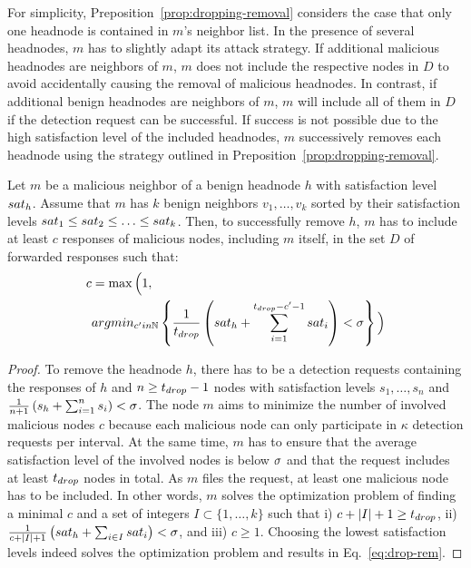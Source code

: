 For simplicity, Preposition~\ref{prop:dropping-removal} considers the case that only one headnode is contained in $m$'s neighbor list. In the presence of several headnodes, $m$ has to slightly adapt its attack strategy. 
If additional malicious headnodes are neighbors of $m$, $m$ does not include the respective nodes in $D$ to avoid accidentally causing the removal of malicious headnodes.  In contrast, if additional benign headnodes are neighbors of $m$, $m$ will include all of them in $D$ if the detection request can be successful. If success is not possible due to the high satisfaction level of the included headnodes, $m$ successively removes each headnode using the strategy outlined in Preposition~\ref{prop:dropping-removal}.   
 

\begin{proposition}
\label{prop:dropping-removal}
Let $m$ be a malicious neighbor of a benign headnode $h$ with satisfaction level $sat_h$. Assume that $m$ has $k$ benign neighbors $v_1, \ldots , v_k$ sorted by their satisfaction levels $sat_1 \leq sat_2 \leq \ldots  \leq sat_k$. 
Then, to successfully remove $h$, $m$ has to include at least $c$ responses of malicious nodes, including $m$ itself, in the set $D$ of forwarded responses such that:
\begin{align}
\label{eq:drop-rem}
\begin{split}
c &= \max \Big( 1,  \\
 & argmin_{c' in \mathbb{N}} 
\left\lbrace \frac{1}{\minP}\left(\sat_h+\sum_{i=1}^{\minP-c'-1}\sat_i \right) < \satThres \right\rbrace 
\Big)
\end{split}
\end{align}
\end{proposition}
\begin{proof}
To remove the headnode $h$, there has to be a detection requests containing the responses of $h$ and $n\geq t_{drop}-1$ nodes with satisfaction levels $s_1, \ldots , s_n$ and 
$\frac{1}{n+1}\left( s_h + \sum_{i=1}^{n}s_i \right) < \sigma$.
The node $m$ aims to minimize the number of involved malicious nodes $c$ because each malicious node can only participate in $\kappa$ detection requests per interval. At the same time, $m$ has to ensure that the average satisfaction level of the involved nodes is below $\sigma$ and that the request includes at least $t_{drop}$ nodes in total. As $m$ files the request, at least one malicious node has to be included. 
In other words, $m$ solves the optimization problem of finding a minimal $c$ and a set of integers $I \subset \{1, \ldots, k\}$ such that i) $c + |I|+1 \geq t_{drop}$, ii) $\frac{1}{c + |I|+1}\left( sat_h + \sum_{i \in I} sat_i \right) < \sigma$, and iii) $c\geq 1$. 
Choosing the lowest satisfaction levels indeed solves the optimization problem and results in Eq.~\ref{eq:drop-rem}. 
\end{proof}

